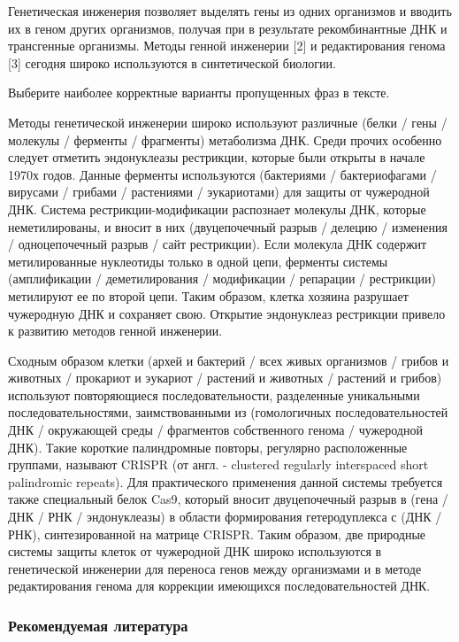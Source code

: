 
Генетическая инженерия позволяет выделять гены из одних организмов и вводить их в геном других организмов, получая при в результате рекомбинантные ДНК и трансгенные организмы. Методы генной инженерии [2] и редактирования генома [3] ﻿сегодня ﻿﻿широко используются в синтетической биологии. 

Выберите наиболее корректные варианты пропущенных фраз в тексте.

Методы генетической инженерии широко используют различные (белки / гены / молекулы / ферменты / фрагменты) 
метаболизма ДНК. Среди прочих особенно следует отметить эндонуклеазы рестрикции, которые были открыты в начале 1970х годов. Данные ферменты используются 
(бактериями / бактериофагами / вирусами / грибами / растениями / эукариотами) 
для защиты от чужеродной ДНК. Система рестрикции-модификации распознает молекулы ДНК, которые неметилированы, и вносит в них 
(двуцепочечный разрыв / делецию / изменения / одноцепочечный разрыв / сайт рестрикции). Если молекула ДНК содержит метилированные нуклеотиды только в одной цепи, ферменты системы 
(амплификации / деметилирования / модификации / репарации / рестрикции) 
метилируют ее по второй цепи. Таким образом, клетка хозяина разрушает чужеродную ДНК и сохраняет свою. Открытие эндонуклеаз рестрикции привело к развитию методов генной инженерии. 

Сходным образом клетки (архей и бактерий / всех живых организмов / грибов и животных / прокариот и эукариот / растений и животных / растений и грибов) 
используют повторяющиеся последовательности, разделенные уникальными последовательностями, заимствованными из 
(гомологичных последовательностей ДНК / окружающей среды / фрагментов собственного генома / чужеродной ДНК). Такие короткие палиндромные повторы, регулярно расположенные группами, называют CRISPR (от англ. - clustered regularly interspaced short palindromic repeats). Для практического применения данной системы требуется также специальный белок Cas9, который вносит двуцепочечный разрыв в 
(гена / ДНК / РНК / эндонуклеазы) в области формирования гетеродуплекса с (ДНК / РНК), синтезированной на матрице CRISPR. Таким образом, две природные системы защиты клеток от чужеродной ДНК широко используются в генетической инженерии для переноса генов между организмами и в методе редактирования генома для коррекции имеющихся последовательностей ДНК. 

\subsubsection*{Рекомендуемая литература}

